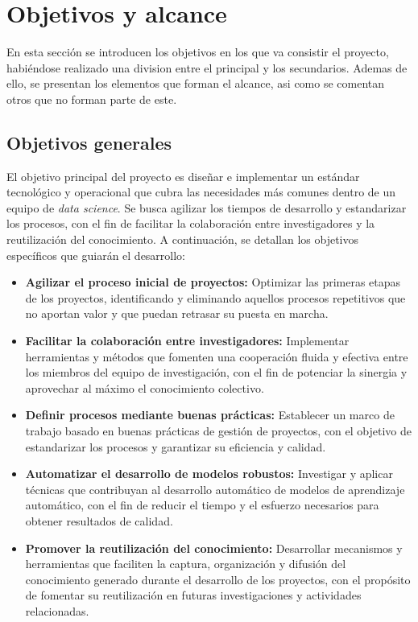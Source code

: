 \section{Objetivos y alcance}
En esta sección se introducen los objetivos en los que va consistir el
proyecto, habiéndose realizado una division entre el principal y los
secundarios. Ademas de ello, se presentan los elementos que forman el alcance,
asi como se comentan otros que no forman parte de este.

\subsection{Objetivos generales}
El objetivo principal del proyecto es diseñar e implementar un estándar tecnológico y 
operacional que cubra las necesidades más comunes dentro de un equipo de \textit{data science}. Se 
busca agilizar los tiempos de desarrollo y estandarizar los procesos, con el fin de
facilitar la colaboración entre investigadores y la reutilización del conocimiento. A
continuación, se detallan los objetivos específicos que guiarán el desarrollo:

\begin{itemize}
    \item \textbf{Agilizar el proceso inicial de proyectos:} Optimizar las primeras etapas 
    de los proyectos, identificando y eliminando aquellos procesos repetitivos que no aportan
    valor y que puedan retrasar su puesta en marcha. 
    \item \textbf{Facilitar la colaboración entre investigadores:} Implementar herramientas y 
    métodos que fomenten una cooperación fluida y efectiva entre los miembros del equipo de 
    investigación, con el fin de potenciar la sinergia y aprovechar al máximo el conocimiento 
    colectivo.
    \item \textbf{Definir procesos mediante buenas prácticas:} Establecer un marco de trabajo 
    basado en buenas prácticas de gestión de proyectos, con el objetivo de estandarizar los 
    procesos y garantizar su eficiencia y calidad.
    \item \textbf{Automatizar el desarrollo de modelos robustos:} Investigar y aplicar 
    técnicas que contribuyan al desarrollo automático de modelos de aprendizaje automático,
    con el fin de reducir el tiempo y el esfuerzo necesarios para obtener resultados de calidad.
    \item \textbf{Promover la reutilización del conocimiento:} Desarrollar mecanismos y herramientas 
    que faciliten la captura, organización y difusión del conocimiento generado durante el desarrollo 
    de los proyectos, con el propósito de fomentar su reutilización en futuras investigaciones y 
    actividades relacionadas.
\end{itemize}

